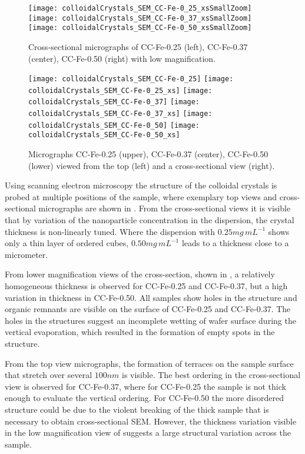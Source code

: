 \documentclass[\main/dresen_thesis.tex]{subfiles}
\begin{document}
  \label{sec:colloidalCrystals:layers:sem}

  \begin{figure}[tb]
    \centering
    \texttt{[image: colloidalCrystals\_SEM\_CC-Fe-0\_25\_xsSmallZoom]}
    \texttt{[image: colloidalCrystals\_SEM\_CC-Fe-0\_37\_xsSmallZoom]}
    \texttt{[image: colloidalCrystals\_SEM\_CC-Fe-0\_50\_xsSmallZoom]}
    \caption{\label{fig:colloidalCrystals:structure:semLowMag}Cross-sectional micrographs of CC-Fe-0.25 (left), CC-Fe-0.37 (center), CC-Fe-0.50 (right) with low magnification.}
  \end{figure}

  \begin{figure}[tb]
    \centering
    \texttt{[image: colloidalCrystals\_SEM\_CC-Fe-0\_25]}
    \texttt{[image: colloidalCrystals\_SEM\_CC-Fe-0\_25\_xs]}
    \texttt{[image: colloidalCrystals\_SEM\_CC-Fe-0\_37]}
    \texttt{[image: colloidalCrystals\_SEM\_CC-Fe-0\_37\_xs]}
    \texttt{[image: colloidalCrystals\_SEM\_CC-Fe-0\_50]}
    \texttt{[image: colloidalCrystals\_SEM\_CC-Fe-0\_50\_xs]}
    \caption{\label{fig:colloidalCrystals:structure:sem}Micrographs CC-Fe-0.25 (upper), CC-Fe-0.37 (center), CC-Fe-0.50 (lower) viewed from the top (left) and a cross-sectional view (right). }
  \end{figure}
  Using scanning electron microscopy the structure of the colloidal crystals is probed at multiple positions of the sample, where exemplary top views and cross-sectional micrographs are shown in .
  From the cross-sectional views it is visible that by variation of the nanoparticle concentration in the dispersion, the crystal thickness is non-linearly tuned.
  Where the dispersion with $0.25 \unit{mg \, mL^{-1}}$ shows only a thin layer of ordered cubes, $0.50 \unit{mg \, mL^{-1}}$ leads to a thickness close to a micrometer.

  From lower magnification views of the cross-section, shown in , a relatively homogeneous thickness is observed for CC-Fe-0.25 and CC-Fe-0.37, but a high variation in thickness in CC-Fe-0.50.
  All samples show holes in the structure and organic remnants are visible on the surface of CC-Fe-0.25 and CC-Fe-0.37.
  The holes in the structures suggest an incomplete wetting of wafer surface during the vertical evaporation, which resulted in the formation of empty spots in the structure.

  From the top view micrographs, the formation of terraces on the sample surface that stretch over several $100 \unit{nm}$ is visible.
  The best ordering in the cross-sectional view is observed for CC-Fe-0.37, where for CC-Fe-0.25 the sample is not thick enough to evaluate the vertical ordering.
  For CC-Fe-0.50 the more disordered structure could be due to the violent breaking of the thick sample that is necessary to obtain cross-sectional SEM.
  However, the thickness variation visible in the low magnification view of  suggests a large structural variation across the sample.
\end{document}
